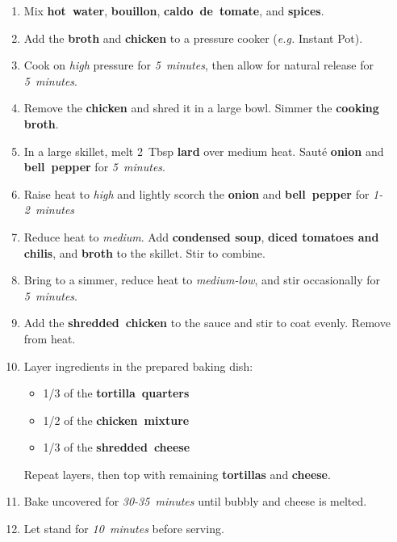 \documentclass[11pt,letterpaper]{article}
\begin{document}
\begin{enumerate}
	\item Mix \textbf{hot~water}, \textbf{bouillon}, \textbf{caldo~de~tomate}, and \textbf{spices}.
    \item Add the \textbf{broth} and \textbf{chicken} to a pressure cooker (\textit{e.g.} Instant Pot).
	\item Cook on \textit{high} pressure for \textit{5~minutes}, then allow for natural release for \textit{5~minutes}.
	\item Remove the \textbf{chicken} and shred it in a large bowl. Simmer the \textbf{cooking broth}.
	\item In a large skillet, melt 2~Tbsp \textbf{lard} over medium heat. Sauté \textbf{onion} and \textbf{bell~pepper} for \textit{5~minutes}.
	\item Raise heat to \textit{high} and lightly scorch the \textbf{onion} and \textbf{bell~pepper} for \textit{1-2~minutes}
    \item Reduce heat to \textit{medium}. Add \textbf{condensed soup}, \textbf{diced tomatoes and chilis}, and \textbf{broth} to the skillet. Stir to combine.
    \item Bring to a simmer, reduce heat to \textit{medium-low}, and stir occasionally for \textit{5~minutes}.
    \item Add the \textbf{shredded~chicken} to the sauce and stir to coat evenly. Remove from heat.
    \item Layer ingredients in the prepared baking dish:
    \begin{itemize}
        \item 1/3 of the \textbf{tortilla~quarters}
        \item 1/2 of the \textbf{chicken~mixture}
        \item 1/3 of the \textbf{shredded~cheese}
    \end{itemize}
    Repeat layers, then top with remaining \textbf{tortillas} and \textbf{cheese}.
    \item Bake uncovered for \textit{30-35~minutes} until bubbly and cheese is melted.
    \item Let stand for \textit{10~minutes} before serving.
\end{enumerate}
\end{document}
